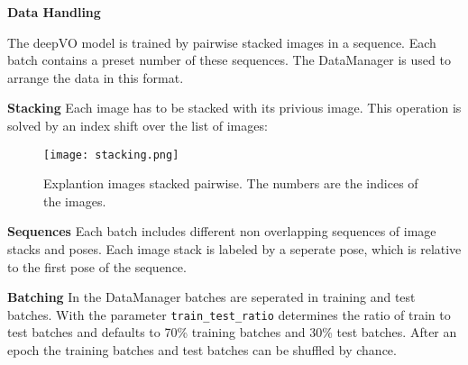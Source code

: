 \documentclass[a4paper,11pt]{article}
\begin{document}
%
%



\textbf{Data Handling}

The deepVO model is trained by pairwise stacked images in a sequence. Each batch contains a preset number of these sequences. The DataManager is used to arrange the data in this format. 

\textbf{Stacking}
Each image has to be stacked with its privious image. This operation is solved by an index shift over the list of images:


\begin{figure}[tbh]
    \centering
    \texttt{[image: stacking.png]}
    \caption{Explantion images stacked pairwise. The numbers are the indices of the images.}
    \label{fig:reference_frame}
\end{figure}

\textbf{Sequences}
Each batch includes different non overlapping sequences of image stacks and poses. Each image stack is labeled by a seperate pose, which is relative to the first pose of the sequence.

\textbf{Batching}
In the DataManager batches are seperated in training and test batches. With the parameter \texttt{train_test_ratio} determines the ratio of train to test batches and defaults to 70\% training batches and 30\% test batches. After an epoch the training batches and test batches can be shuffled by chance.
\end{document}
